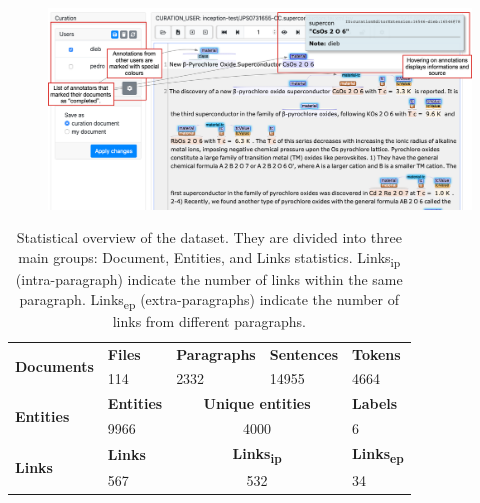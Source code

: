 \documentclass[fleqn,10pt]{wlscirep}
\begin{document}
\begin{figure}[htb]
    \centering
    \includegraphics[width=\linewidth]{inception-curation-new.png}
    \label{fig:inception-curation-interface}
\end{figure}

\begin{table}[ht]
    \centering
    \begin{tabular}{ |m{6em}  | m{4em} | m{6em} | m{7em} | m{6em} |} 
    \hline
        \multirow{2}{5em}{\textbf{Documents}} & \textbf{Files} & \textbf{Paragraphs} &	\textbf{Sentences} & \textbf{Tokens}\\
         & 114  &	2332 & 	14955 & 	4664\\
    \hline\hline
        \multirow{2}{5em}{\textbf{Entities}} & \textbf{Entities} &  \multicolumn{2}{|c|}{\textbf{Unique entities}} &  \textbf{ Labels} \\
        & 9966 &  \multicolumn{2}{|c|}{4000} &  6 \\
    \hline\hline
        \multirow{2}{5em}{\textbf{Links}} & \textbf{Links} & \multicolumn{2}{|c|}{\textbf{Links\textsubscript{ip}}} 
        & \textbf{Links\textsubscript{ep}}\\
        & 567  & \multicolumn{2}{|c|}{532}&	34	\\
    \hline
    \end{tabular}
    \caption{Statistical overview of the dataset. They are divided into three main groups: Document, Entities, and Links statistics.
    Links\textsubscript{ip} (intra-paragraph) indicate the number of links within the same paragraph. Links\textsubscript{ep} (extra-paragraphs) indicate the number of links from different paragraphs.  }
    \label{table:summary-content}
\end{table}
\end{document}
